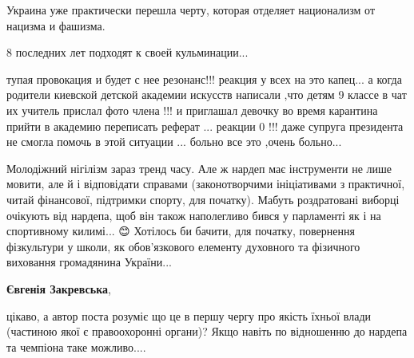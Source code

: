 \begin{itemize}
 

Украина уже практически перешла черту, которая отделяет национализм от нацизма и фашизма.

8 последних лет подходят к своей кульминации...

 

тупая провокация и будет с нее резонанс!!! реакция у всех на это капец... а
когда родители киевской детской академии искусств написали ,что детям 9 классе
в чат их учитель прислал фото члена !!! и приглашал девочку во время карантина
прийти в академию переписать реферат ... реакции 0 !!! даже супруга президента
не смогла помочь в этой ситуации ... больно все это ,очень больно...


 

Молодіжний нігілізм зараз тренд часу. Але ж нардеп має інструменти не лише
мовити, але й і відповідати справами (законотворчими ініціативами з практичної,
читай фінансової, підтримки спорту, для початку). Мабуть роздратовані виборці
очікують від нардепа, щоб він також наполегливо бився у парламенті як і на
спортивному килимі... 😊 Хотілось би бачити, для початку, повернення
фізкультури у школи, як обов'язкового елементу духовного та фізичного виховання
громадянина України...

 
\textbf{Євгенія Закревська}, 

цікаво, а автор поста розуміє що це в першу чергу про якість їхньої влади
(частиною якої є правоохоронні органи)? Якщо навіть по відношенню до нардепа та
чемпіона таке можливо....

\begin{itemize}


\end{itemize}
\end{itemize}

